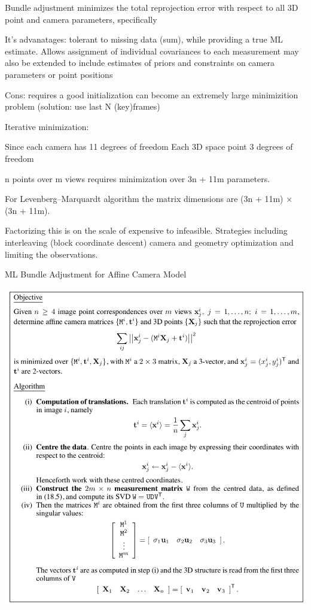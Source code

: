 Bundle adjustment minimizes the total reprojection error with respect to all 3D point and camera parameters, specifically

It's advanatages: tolerant to missing data (sum), while providing a true ML estimate. 
Allows assignment of individual covariances to each measurement
may also be extended to include estimates of priors and constraints on camera parameters or point positions

Cons:
requires a good initialization 
can become an extremely large minimizition problem (solution: use last N (key)frames)

Iterative minimization:

Since each camera has 11 degrees of freedom 
Each 3D space point 3 degrees of freedom

n points over m views requires minimization over 3n + 11m parameters. 

For Levenberg–Marquardt algorithm the matrix dimensions are (3n + 11m) × (3n + 11m). 

Factorizing this is on the scale of expensive to infeasible. Strategies including interleaving (block coordinate descent) camera and geometry optimization and limiting the observations.

ML Bundle Adjustment for Affine Camera Model

\includegraphics[width=1.0\columnwidth]{cv_figures/ml_bundle.png}

